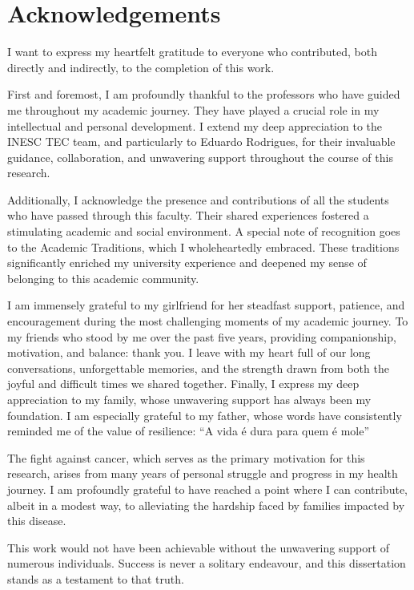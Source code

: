 \chapter*{Acknowledgements}


I want to express my heartfelt gratitude to everyone who contributed, both directly and indirectly, to the completion of this work.

First and foremost, I am profoundly thankful to the professors who have guided me throughout my academic journey. They have played a crucial role in my intellectual and personal development.
I extend my deep appreciation to the INESC TEC team, and particularly to Eduardo Rodrigues, for their invaluable guidance, collaboration, and unwavering support throughout the course of this research.

Additionally, I acknowledge the presence and contributions of all the students who have passed through this faculty. Their shared experiences fostered a stimulating academic and social environment.
A special note of recognition goes to the Academic Traditions, which I wholeheartedly embraced. These traditions significantly enriched my university experience and deepened my sense of belonging to this academic community.

I am immensely grateful to my girlfriend for her steadfast support, patience, and encouragement during the most challenging moments of my academic journey.
To my friends who stood by me over the past five years, providing companionship, motivation, and balance: thank you. I leave with my heart full of our long conversations, unforgettable memories, and the strength drawn from both the joyful and difficult times we shared together.
Finally, I express my deep appreciation to my family, whose unwavering support has always been my foundation. I am especially grateful to my father, whose words have consistently reminded me of the value of resilience: “A vida é dura para quem é mole”

The fight against cancer, which serves as the primary motivation for this research, arises from many years of personal struggle and progress in my health journey. I am profoundly grateful to have reached a point where I can contribute, albeit in a modest way, to alleviating the hardship faced by families impacted by this disease.

This work would not have been achievable without the unwavering support of numerous individuals. Success is never a solitary endeavour, and this dissertation stands as a testament to that truth.

